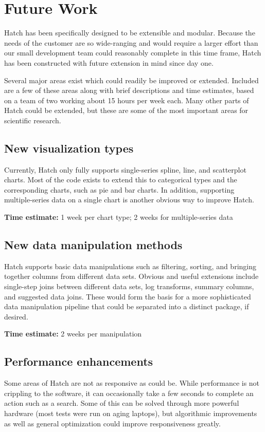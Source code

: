 \section{Future Work}

Hatch has been specifically designed to be extensible and modular.  Because the needs
of the customer are so wide-ranging and would require a larger effort than our small
development team could reasonably complete in this time frame, Hatch has been
constructed with future extension in mind since day one.

Several major areas exist which could readily be improved or extended.  Included are
a few of these areas along with brief descriptions and time estimates, based on a team of
two working about 15 hours per week each.  Many other parts of Hatch could be extended,
but these are some of the most important areas for scientific research.

\subsection{New visualization types}
Currently, Hatch only fully supports single-series spline, line, and scatterplot
charts. Most of the code exists to extend this to categorical types and the
corresponding charts, such as pie and bar charts.  In addition, supporting
multiple-series data on a single chart is another obvious way to improve Hatch.

\textbf{Time estimate:} 1 week per chart type; 2 weeks for multiple-series data

\subsection{New data manipulation methods}
Hatch supports basic data manipulations such as filtering, sorting, and bringing
together columns from different data sets.  Obvious and useful extensions include
single-step joins between different data sets, log transforms, summary columns,
and suggested data joins.  These would form the basis for a more sophisticated
data manipulation pipeline that could be separated into a distinct package,
if desired.

\textbf{Time estimate:} 2 weeks per manipulation

\subsection{Performance enhancements}
Some areas of Hatch are not as responsive as could be.  While performance is not
crippling to the software, it can occasionally take a few seconds to complete
an action such as a search.  Some of this can be solved through more powerful
hardware (most tests were run on aging laptops), but algorithmic improvements
as well as general optimization could improve responsiveness greatly.

